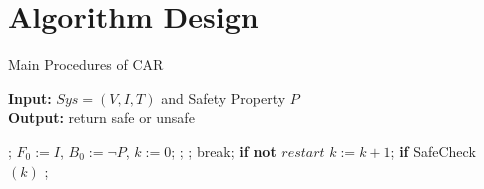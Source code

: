 \section{Algorithm Design}
\begin{algorithm}[thb]
\caption{Main Procedures of CAR}\label{alg:car}
\hspace*{0.02in} {\bf Input:} %
$Sys=(V,I,T)$ and Safety Property $P$ \\
\hspace*{0.02in} {\bf Output:} %
return safe or unsafe
  \begin{algorithmic}[1]
        ;\label{alg:car:start} \EndIf            
       \State $F_0 := I$, $B_0 := \neg P$, $k := 0$;\label{alg:car:initialsequence} 
       ;\label{alg:car:init}
        \label{alg:car:loopstart}                                                                 
            \label{alg:car:pickstate} 
                \label{alg:car:unsafecheck} ; \EndIf
                  break;\label{alg:car:restartbreak} \EndIf
            \EndWhile          
            \State \textbf{if} {\bf not} {\color{red}$restart$}\label{alg:car:restartcontrol} 
            \State \qquad $k := k+1$;
            \State \qquad \textbf{if} {\sc SafeCheck} $(k)$ ;\label{alg:car:safecheck}
            

\end{algorithmic}
\end{algorithm}

